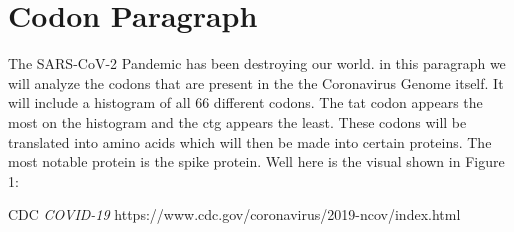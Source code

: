 \section{Codon Paragraph}

The SARS-CoV-2 Pandemic has been destroying our world. in this paragraph we will analyze the codons that are present in the the Coronavirus Genome itself. It will include a histogram of all 66 different codons. The tat codon appears the most on the histogram and the ctg appears the least. These codons will be translated into amino acids which will then be made into certain proteins. The most notable protein is the spike protein. Well here is the visual shown in Figure 1:


\begin{thebibliography}{1}

 CDC \emph{COVID-19} https://www.cdc.gov/coronavirus/2019-ncov/index.html

\end{thebibliography}
